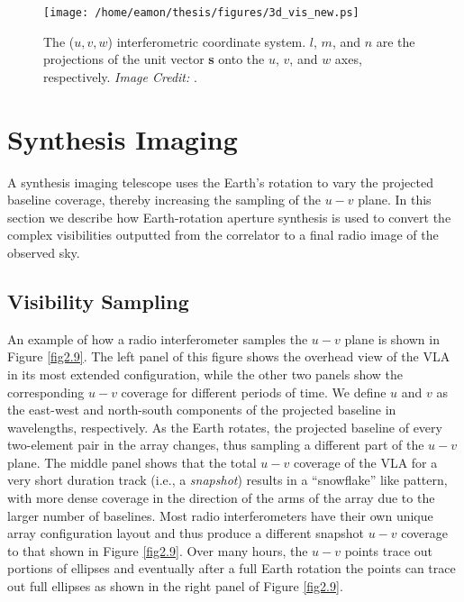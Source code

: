 
\begin{figure}[t!]
\centering 
          \texttt{[image: /home/eamon/thesis/figures/3d\_vis\_new.ps]}
\caption[Interferometric coordinate system]{The ($u,v,w$) interferometric coordinate system. $l$, $m$, and $n$ are the projections of the unit vector \textbf{s} onto the $u$, $v$, and $w$ axes, respectively. \textit{Image Credit:} \cite{taylor_1999}.}
\label{fig2.8}
\end{figure}

\section{Synthesis Imaging}\label{sec:4}
A synthesis imaging telescope uses the Earth's rotation to vary the projected baseline coverage, thereby increasing the sampling of the $u-v$ plane. In this section we describe how Earth-rotation aperture synthesis is used to convert the complex visibilities outputted from the correlator to a final radio image of the observed sky.
\subsection{Visibility Sampling}\label{subsec:4.1}
An example of how a radio interferometer samples the $u-v$ plane is shown in Figure \ref{fig2.9}. The left panel of this figure shows the overhead view of the VLA in its most extended configuration, while the other two panels show the corresponding $u-v$ coverage for different periods of time. We define $u$ and $v$ as the east-west and north-south components of the projected baseline in wavelengths, respectively. As the Earth rotates, the projected baseline of every two-element pair in the array changes, thus sampling a different part of the $u-v$ plane. The middle panel shows that the total $u-v$ coverage of the VLA for a very short duration track (i.e., a \textit{snapshot}) results in a ``snowflake'' like pattern, with more dense coverage in the direction of the arms of the array due to the larger number of baselines. Most radio interferometers have their own unique array configuration layout and thus produce a different snapshot $u-v$ coverage to that shown in Figure \ref{fig2.9}. Over many hours, the $u-v$ points trace out portions of ellipses and eventually after a full Earth rotation the points can trace out full ellipses as shown in the right panel of Figure \ref{fig2.9}. 

